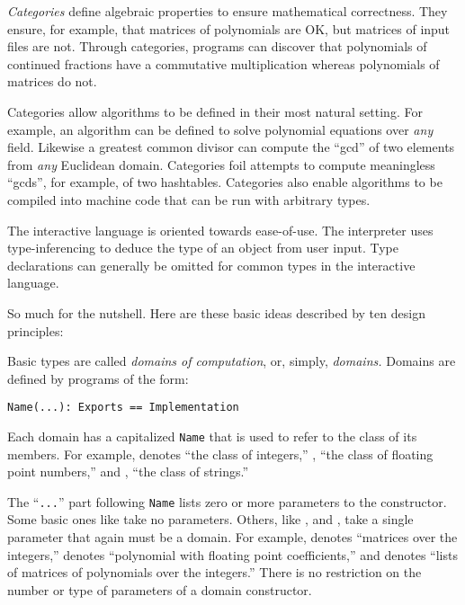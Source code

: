 {\it Categories} define
algebraic properties to ensure mathematical
correctness. They ensure, for example,
that matrices of polynomials are OK, but
matrices of input files are not.
Through categories, programs can
discover that polynomials of continued fractions
have a commutative
multiplication whereas polynomials of matrices do not.

Categories allow algorithms to be defined in their most natural
setting. For example,
an algorithm can be defined to solve polynomial
equations over {\it any} field.
Likewise a greatest common divisor
can compute the ``gcd'' of two elements
from {\it any} Euclidean domain.
Categories foil
attempts to compute meaningless ``gcds'', for example, of two hashtables.
Categories also enable
algorithms to be compiled into machine code that can be run with
arbitrary types.

The \Language{} interactive language is oriented towards
ease-of-use.
The \Language{} interpreter uses
type-inferencing to deduce the
type of an object from user input.
Type declarations can generally be omitted for common types in the
interactive language.

So much for the nutshell.
Here are these basic ideas described by ten design principles:

%

\par %
Basic types are called {\it domains of computation}, or,
simply, {\it domains.}
Domains are defined by \Language{} programs of the form:

\begin{verbatim}
Name(...): Exports == Implementation
\end{verbatim}
Each domain has a capitalized {\tt Name} that is
used to refer to the class of its
members.
For example,  denotes ``the class of integers,''
, ``the class of floating point numbers,'' and
, ``the class of strings.''

The ``{\tt ...}'' part following {\tt Name} lists zero or more parameters
to the constructor.
Some basic ones like 
take no parameters.
Others, like ,  and
, take a single parameter that again must be a domain.
For example,  denotes ``matrices over the
integers,''  denotes ``polynomial with
floating point coefficients,'' and
 denotes ``lists of matrices
of polynomials over the integers.''
There is no restriction on the number or type of
parameters of a domain constructor.

